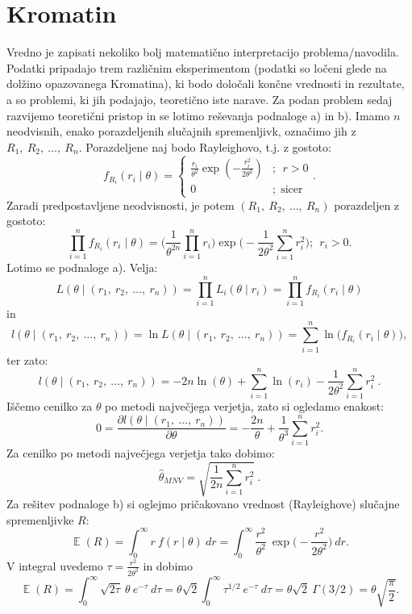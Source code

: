 \documentclass{article}
\DeclareMathOperator{\EX}{\mathbb{E}}
\begin{document}
\pagebreak

\section{Kromatin}
Vredno je zapisati nekoliko bolj matematično interpretacijo problema/navodila. 
Podatki pripadajo trem različnim eksperimentom (podatki so ločeni glede na dolžino opazovanega Kromatina), ki bodo določali končne vrednosti in rezultate, a so problemi, ki jih podajajo, teoretično iste narave. 
Za podan problem sedaj razvijemo teoretični pristop in se lotimo reševanja podnaloge a) in b). 
\newline
Imamo $n$ neodvisnih, enako porazdeljenih slučajnih spremenljivk, označimo jih z $R_1,~R_2,~\dots,~R_n$. 
Porazdeljene naj bodo Rayleighovo, t.j. z gostoto:
$$
f_{R_i}(r_{i} \mid \theta)=\left\{\begin{array}{cl}
\frac{r_i}{\theta^{2}} \exp \left(-\frac{r_{i}^{2}}{2 \theta^{2}}\right) & ;~~r>0 \\
0 & ;~~\text{sicer }
\end{array}\right. .
$$
Zaradi predpostavljene neodvisnosti, je potem $(R_1,~R_2,~\dots,~R_n)$ porazdeljen z gostoto:
$$
    \prod_{i=1}^{n}{f_{R_i}(r_{i} \mid \theta)} = 
    \bigg(\frac{1}{\theta^{2n}}\prod_{i=1}^{n}{r_i}\bigg) \exp\bigg(-\frac{1}{2 \theta^{2}} \sum_{i=1}^{n}{r_i^2}\bigg);~~r_i>0.
$$
Lotimo se podnaloge a). Velja:
$$
L(\theta \mid (r_1,~r_2,~\dots,~r_n)) = \prod_{i=1}^{n}{L_i(\theta \mid r_i)} = \prod_{i=1}^{n}{f_{R_i}(r_i \mid \theta)}
$$
in
$$
l(\theta \mid (r_1,~r_2,~\dots,~r_n)) = \ln L(\theta \mid (r_1,~r_2,~\dots,~r_n)) = \sum_{i=1}^{n}{\ln \big(f_{R_i}(r_i \mid \theta)\big)}, 
$$
ter zato:
$$
l(\theta \mid (r_1,~r_2,~\dots,~r_n)) = -2n \ln(\theta) + \sum_{i=1}^{n}{\ln(r_i)} - \frac{1}{2\theta^2} \sum_{i=1}^{n}{r_i^2}~.
$$
Iščemo cenilko za $\theta$ po metodi največjega verjetja, zato si ogledamo enakost:
$$
0 = \frac{\partial l(\theta \mid (r_1,~\dots,~r_n))}{\partial \theta} = - \frac{2n}{\theta} + \frac{1}{\theta^3}\sum_{i=1}^{n}{r_i^2}.
$$
Za cenilko po metodi največjega verjetja tako dobimo:
$$
\hat{\theta}_{MNV} = \sqrt{\frac{1}{2n}{\sum_{i=1}^{n}{r_i^2}}}~.
$$
Za rešitev podnaloge b) si oglejmo pričakovano vrednost (Rayleighove) slučajne spremenljivke $R$:
$$
\EX(R) = \int_{0}^{\infty}{r~f(r \mid \theta)~dr}= \int_{0}^{\infty}{\frac{r^2}{\theta^{2}}~\exp\Big(-\frac{r^{2}}{2 \theta^{2}}\Big)~dr}.
$$
V integral uvedemo $\tau = \frac{r^{2}}{2 \theta^{2}}$ in dobimo
$$
\EX(R) = \int_{0}^{\infty}{\sqrt{2 \tau}~\theta ~e^{-\tau}~ d \tau} = \theta \sqrt{2}\int_{0}^{\infty}{\tau^{1/2}~e^{-\tau}~ d \tau} = \theta\sqrt{2}~\Gamma(3/2) = \theta \sqrt{\frac{\pi}{2}}.
$$
\end{document}
